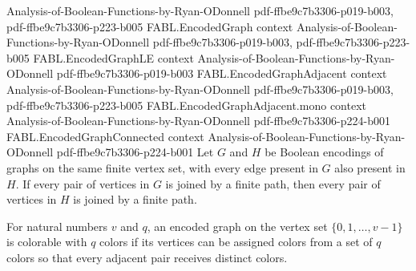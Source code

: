 \begin{theorem}
  {Analysis-of-Boolean-Functions-by-Ryan-ODonnell}
  {pdf-ffbe9c7b3306-p019-b003,
    pdf-ffbe9c7b3306-p223-b005}
\proofstep
  {FABL.EncodedGraph}
  {context}
  {Analysis-of-Boolean-Functions-by-Ryan-ODonnell}
  {pdf-ffbe9c7b3306-p019-b003,
    pdf-ffbe9c7b3306-p223-b005}
\proofstep
  {FABL.EncodedGraphLE}
  {context}
  {Analysis-of-Boolean-Functions-by-Ryan-ODonnell}
  {pdf-ffbe9c7b3306-p019-b003}
\proofstep
  {FABL.EncodedGraphAdjacent}
  {context}
  {Analysis-of-Boolean-Functions-by-Ryan-ODonnell}
  {pdf-ffbe9c7b3306-p019-b003,
    pdf-ffbe9c7b3306-p223-b005}
\proofstep
  {FABL.EncodedGraphAdjacent.mono}
  {context}
  {Analysis-of-Boolean-Functions-by-Ryan-ODonnell}
  {pdf-ffbe9c7b3306-p224-b001}
\proofstep
  {FABL.EncodedGraphConnected}
  {context}
  {Analysis-of-Boolean-Functions-by-Ryan-ODonnell}
  {pdf-ffbe9c7b3306-p224-b001}
Let $G$ and $H$ be Boolean encodings of graphs on the same finite vertex set, with every
edge present in $G$ also present in $H$. If every pair of vertices in $G$ is joined by a
finite path, then every pair of vertices in $H$ is joined by a finite path.
\end{theorem}

\begin{definition}
\label{FABL.EncodedGraphColorable}
\leanok
{}
For natural numbers $v$ and $q$, an encoded graph on the vertex set $\{0,1,\ldots,v-1\}$
is colorable with $q$ colors if its vertices can be assigned colors from a set of $q$
colors so that every adjacent pair receives distinct colors.
\end{definition}

